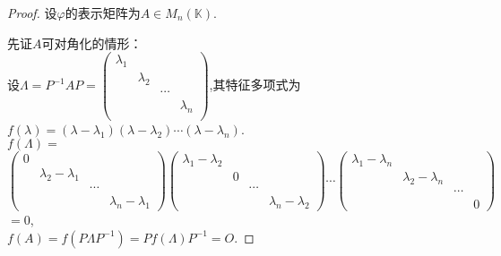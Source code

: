 \begin{proof}
  设$\varphi$的表示矩阵为$A \in M_n(\mathbb{K})$.

  先证$A$可对角化的情形：\\
  设$\Lambda = P^{-1}AP=
  \begin{pmatrix}
    \lambda_1 & & & \\
              & \lambda_2 & & \\
              & & \cdots & \\
    & & & \lambda_n\\
  \end{pmatrix}$,其特征多项式为
  $f(\lambda)=(\lambda-\lambda_1)(\lambda-\lambda_2)\cdots(\lambda-\lambda_n)$.\\
  $f(\Lambda)=$\\
  $\begin{pmatrix}
    0 & & & \\
      &\lambda_2-\lambda_1& & \\
      & & \cdots & \\
      & & &\lambda_n-\lambda_1
  \end{pmatrix}
  \begin{pmatrix}
    \lambda_1-\lambda_2& & & \\
                       & 0 & & \\
                       & & \cdots & \\
      & & & \lambda_n-\lambda_2
  \end{pmatrix}\cdots
  \begin{pmatrix}
    \lambda_1-\lambda_n & & & \\
                        & \lambda_2-\lambda_n & & \\
                        & & \cdots & \\
      & & & 0
  \end{pmatrix}$\\
  $=0$,\\
  $f(A)=f(P\Lambda P^{-1})=Pf(\Lambda)P^{-1}=O$.


\end{proof}

